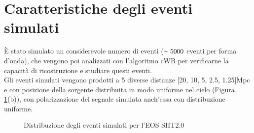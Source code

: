 \section{Caratteristiche degli eventi simulati}
\label{subsection:cwb_injections}
È stato simulato un considerevole numero di eventi ($\smallsim 5000$ eventi per forma d'onda), che vengono poi analizzati con l'algoritmo cWB per verificarne la capacità di ricostruzione e studiare questi eventi.\\
Gli eventi simulati vengono prodotti a 5 diverse distanze [20, 10, 5, 2.5, 1.25]Mpc e con posizione della sorgente distribuita in modo uniforme nel cielo (Figura \ref{fig:skypos}(b)), con polarizzazione del segnale simulata anch'essa con distribuzione uniforme.
\begin{figure}[hbt!]
	\vspace{-20pt}
	\centering
	\quad
	\vspace{-5pt}
	\caption{Distribuzione degli eventi simulati per l'EOS SHT2.0}
	\label{fig:skypos}
	\vspace{-10pt}
\end{figure}
